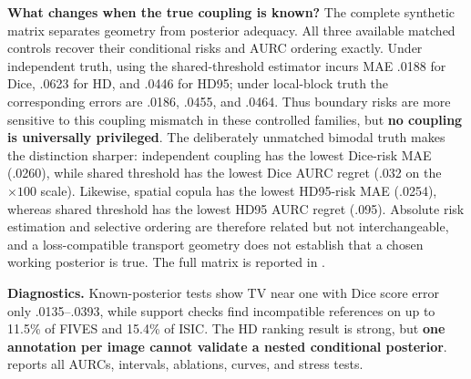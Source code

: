 \noindent\textbf{What changes when the true coupling is known?}
The complete synthetic matrix separates geometry from posterior adequacy.
All three available matched controls recover their conditional risks and
AURC ordering exactly. Under independent truth, using the shared-threshold
estimator incurs MAE .0188 for Dice, .0623 for HD, and .0446 for HD95; under
local-block truth the corresponding errors are .0186, .0455, and .0464.
Thus boundary risks are more sensitive to this coupling mismatch in these
controlled families, but \textbf{no coupling is universally privileged}.
The deliberately unmatched bimodal truth makes the distinction sharper:
independent coupling has the lowest Dice-risk MAE (.0260), while shared
threshold has the lowest Dice AURC regret (.032 on the \(\times100\) scale).
Likewise, spatial copula has the lowest HD95-risk MAE (.0254), whereas shared
threshold has the lowest HD95 AURC regret (.095). Absolute risk estimation and
selective ordering are therefore related but not interchangeable, and a
loss-compatible transport geometry does not establish that a chosen
working posterior is true. The full matrix is reported in
.

\clearpage

\noindent\textbf{Diagnostics.}
Known-posterior tests show TV near one with Dice score error only .0135--.0393,
while support
checks find incompatible references on up to 11.5\% of FIVES and 15.4\% of
ISIC. The HD ranking result is strong, but \textbf{one annotation per image cannot
validate a nested conditional posterior}. 
reports all AURCs, intervals, ablations, curves, and stress tests.
